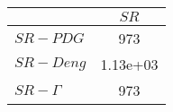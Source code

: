 \begin{tabular}{l|c}
\toprule
{} &     $SR$ \\
\midrule
\textbf{$SR-PDG$   } &      973 \\
\textbf{$SR-Deng$  } & 1.13e+03 \\
\textbf{$SR-\Gamma$} &      973 \\
\bottomrule
\end{tabular}
